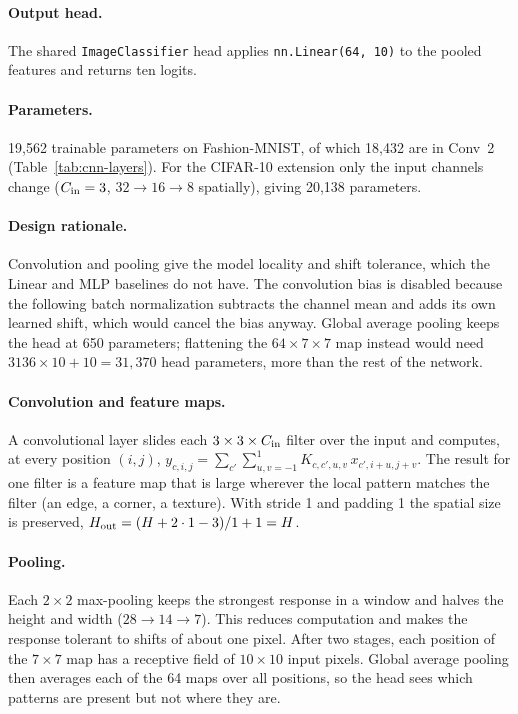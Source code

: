 \paragraph{Output head.} The shared \texttt{ImageClassifier} head applies
\texttt{nn.Linear(64, 10)} to the pooled features and returns ten logits.

\paragraph{Parameters.} 19,562 trainable parameters on Fashion-MNIST, of which
18,432 are in Conv~2 (Table~\ref{tab:cnn-layers}). For the CIFAR-10 extension
only the input channels change ($C_{\rm in}=3$, $32\to16\to8$ spatially),
giving 20,138 parameters.

\paragraph{Design rationale.} Convolution and pooling give the model locality
and shift tolerance, which the Linear and MLP baselines do not have. The
convolution bias is disabled because the following batch normalization
subtracts the channel mean and adds its own learned shift, which would cancel
the bias anyway. Global average pooling keeps the head at 650 parameters;
flattening the $64\times7\times7$ map instead would need
$3136\times10+10=31{,}370$ head parameters, more than the rest of the network.

\paragraph{Convolution and feature maps.} A convolutional layer slides each
$3\times3\times C_{\rm in}$ filter over the input and computes, at every
position $(i,j)$,
$y_{c,i,j}=\sum_{c'}\sum_{u,v=-1}^{1}K_{c,c',u,v}\,x_{c',i+u,j+v}$.
The result for one filter is a feature map that is large wherever the local
pattern matches the filter (an edge, a corner, a texture). With stride 1 and
padding 1 the spatial size is preserved, $H_{\rm out}=(H+2\cdot1-3)/1+1=H$.

\paragraph{Pooling.} Each $2\times2$ max-pooling keeps the strongest response
in a window and halves the height and width ($28\to14\to7$). This reduces
computation and makes the response tolerant to shifts of about one pixel.
After two stages, each position of the $7\times7$ map has a receptive field of
$10\times10$ input pixels. Global average pooling then averages each of the 64
maps over all positions, so the head sees which patterns are present but not
where they are.

